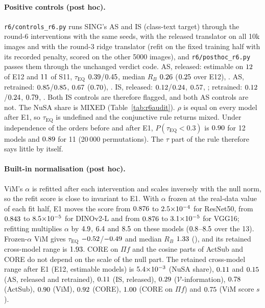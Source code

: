 \documentclass[10pt]{article}
\begin{document}
\paragraph{Positive controls (post hoc).} \texttt{r6/controls\_r6.py} runs SING's AS and IS (class-text target) through the round-6 interventions with the same seeds, with the released translator on all 10k images and with the round-3 ridge translator (refit on the fixed training half with its recorded penalty, scored on the other 5000 images), and \texttt{r6/posthoc\_r6.py} passes them through the unchanged verdict code. AS, released: estimable on $12$ of E12 and $11$ of S11, $\tau_{\mathrm{EQ}}$ $0.39$/$0.45$, median $R_B$ $0.26$ ($0.25$ over E12), \RPASrelVerdict. AS, retrained: $0.85$/$0.85$, $0.67$ ($0.70$), \RPASretVerdict. IS, released: $0.12$/$0.24$, $0.57$, \RPISrelVerdict; retrained: $0.12$/$0.24$, $0.79$, \RPISretVerdict. Both IS controls are therefore flagged, and both AS controls are not. The NuSA share is MIXED (Table~\ref{tab:r6audit}). $\rho$ is equal on every model after E1, so $\tau_{\mathrm{EQ}}$ is undefined and the conjunctive rule returns mixed. Under independence of the orders before and after E1, $P(\tau_{\mathrm{EQ}}{<}0.3)$ is $0.90$ for 12 models and $0.89$ for 11 (20\,000 permutations). The $\tau$ part of the rule therefore says little by itself.

\paragraph{Built-in normalisation (post hoc).} ViM's $\alpha$ is refitted after each intervention and scales inversely with the null norm, so the refit score is close to invariant to E1. With $\alpha$ frozen at the real-data value of each fit half, E1 moves the score from $0.876$ to $2.5{\times}10^{-4}$ for ResNet50, from $0.843$ to $8.5{\times}10^{-5}$ for DINOv2-L and from $0.876$ to $3.1{\times}10^{-5}$ for VGG16; refitting multiplies $\alpha$ by $4.9$, $6.4$ and $8.5$ on these models ($0.8$--$8.5$ over the 13). Frozen-$\alpha$ ViM gives $\tau_{\mathrm{EQ}}$ $-0.52$/$-0.49$ and median $R_B$ $1.33$ (\RPVimFrVerdict), and its retained cross-model range is $1.93$. CORE on $\Pi f$ and the cosine parts of ActSub and CORE do not depend on the scale of the null part. The retained cross-model range after E1 (E12, estimable models) is $5.4{\times}10^{-3}$ (NuSA share), $0.11$ and $0.15$ (AS, released and retrained), $0.11$ (IS, released), $0.29$ ($\mathcal{V}$-information), $0.78$ (ActSub), $0.90$ (ViM), $0.92$ (CORE), $1.00$ (CORE on $\Pi f$) and $0.75$ (ViM score $s$).
\end{document}
